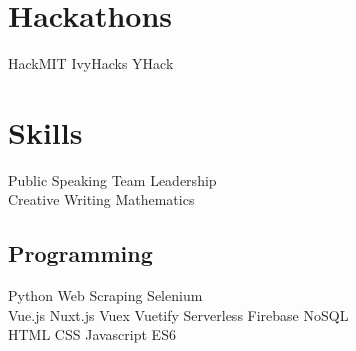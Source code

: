 \documentclass[]{deedy-resume-openfont}
\begin{document}
\begin{minipage}[t]{0.3\textwidth}
\section{Hackathons}
HackMIT \textbullet{} IvyHacks \textbullet{} YHack



\section{Skills}
Public Speaking \textbullet{} Team Leadership \\
Creative Writing \textbullet{} Mathematics
\sectionsep
\subsection{Programming}
Python \textbullet{} Web Scraping \textbullet{} Selenium \\ 
Vue.js \textbullet{} Nuxt.js \textbullet{} Vuex \textbullet{} Vuetify
Serverless \textbullet{} Firebase \textbullet{} NoSQL \\
HTML \textbullet{} CSS \textbullet{} Javascript ES6 \\


%
%

\end{minipage} 
\hfill
\end{document}
